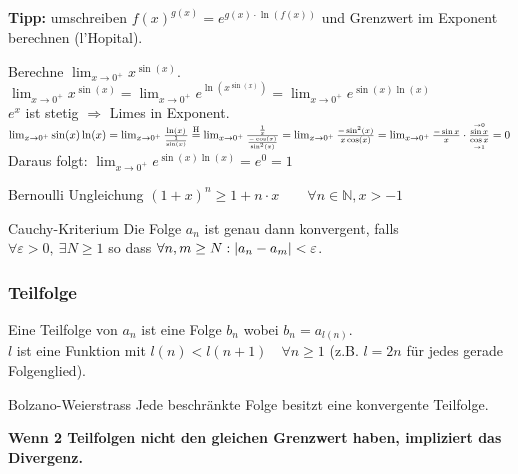 \documentclass[a4paper,fontsize = 7pt]{scrartcl}
\def\N{\mathbb{N}}
\begin{document}
\textbf{Tipp:} umschreiben $f(x)^{g(x)} = e^{g(x) \cdot \ln \left( f(x) \right)}$ und Grenzwert im Exponent berechnen (l'Hopital).
\begin{subbox}{	Berechne $\lim_{x \to 0^+} x^{\sin(x)}$.}
  \vspace{-6pt}
		$\lim_{x \to 0^+} x^{\sin(x)} = \lim_{x \to 0^+} e^{ \ln \left( x^{\sin(x)} \right)} 
    = \lim_{x \to 0^+} e^{\sin (x) \ln (x)}$
	\\$e^x$ ist stetig $\Rightarrow$ Limes in Exponent.
	$
		\lim_{x \to 0^+} \sin(x) \ln(x) = \lim_{x \to 0^+} \frac{\ln(x)}{\frac{1}{\sin(x)}}
		\\\overset{\text{H}}{=} \lim_{x \to 0^+} \frac{\frac{1}{x}}{\frac{-\cos (x)}{\sin^2 (x)}} = \lim_{x \to0^+} \frac{- \sin^2 (x)}{x \cos (x)}\\
						= \lim_{x \to 0^+} \frac{- \sin x}{x} \cdot \frac{\overset{\to 0}{\sin x}}{\underset{\to 1}{\cos x}} = 0
	$
	\\Daraus folgt: $\lim_{x \to 0^+} e^{\sin (x) \ln (x)} = e^0 = 1$
  \vspace{-4pt}
\end{subbox}

\begin{mainbox}{Bernoulli Ungleichung}
  \vspace{-4pt}
  $(1 + x)^n \geq 1 + n \cdot x \qquad \forall n \in \N, x > -1$
  \vspace{-4pt}
\end{mainbox}

\begin{mainbox}{Cauchy-Kriterium}
  \vspace{-4pt}
Die Folge $a_n$ ist genau dann konvergent, falls \\ $\forall \varepsilon > 0, \ \exists N \ge 1$ so dass $\forall n,m \ge N: \\ | a_n - a_m | < \varepsilon$.
  \vspace{-4pt}
\end{mainbox}

\subsubsection{Teilfolge}
Eine Teilfolge von $a_n$ ist eine Folge $b_n$ wobei $b_n = a_{l(n)}$.
\\ $l$ ist eine Funktion mit $l(n) < l(n+1) \quad \forall n \ge 1$ (z.B. $l = 2n$ für jedes gerade Folgenglied). 

\begin{subbox}{Bolzano-Weierstrass}
Jede beschränkte Folge besitzt eine konvergente Teilfolge.
\end{subbox}
 \textbf{Wenn 2 Teilfolgen nicht den gleichen Grenzwert haben, impliziert das Divergenz.}
\end{document}
